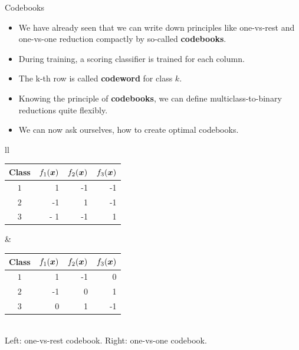 \begin{vbframe}{Codebooks}

  \begin{itemize}
\item We have already seen that we can write down principles like one-vs-rest and one-vs-one reduction compactly by so-called \textbf{codebooks}. 
\item During training, a scoring classifier is trained for each column.
\item The k-th row is called \textbf{codeword} for class $k$.
\item Knowing the principle of \textbf{codebooks}, we can define multiclass-to-binary reductions quite flexibly.
\item We can now ask ourselves, how to create optimal codebooks.
\end{itemize}

  \begin{center}
  \begin{footnotesize}
  \begin{tabular}{ll}
    \begin{tabular}{|c|r|r|r|} \hline
    \textbf{Class}  & \textbf{$f_1{(\bm{x})}$} & \textbf{$f_2{(\bm{x})}$}  & \textbf{$f_3{(\bm{x})}$} \\ \hline
    \textbf{$1$}  &   1                 & -1                   & -1                   \\ \hline
    \textbf{$2$}  &  -1                 &  1                   & -1                   \\ \hline
    \textbf{$3$}  & - 1                 & -1                   &  1                   \\ \hline

    \end{tabular}
    &
    \begin{tabular}{|c|r|r|r|} \hline
    \textbf{Class}  & \textbf{$f_1{(\bm{x})}$} & \textbf{$f_2{(\bm{x})}$}  & \textbf{$f_3{(\bm{x})}$} \\ \hline
    \textbf{$1$}  &   1                 & -1                   & 0                  \\ \hline
    \textbf{$2$}  &  -1                 &  0                   & 1                   \\ \hline
    \textbf{$3$}  & 0                  &  1                   &  -1                   \\ \hline
    \end{tabular}
  \end{tabular} \\
  \vspace*{0.1cm}
    Left: one-vs-rest codebook. Right: one-vs-one codebook. 
  \end{footnotesize}
\end{center}



\end{vbframe}

